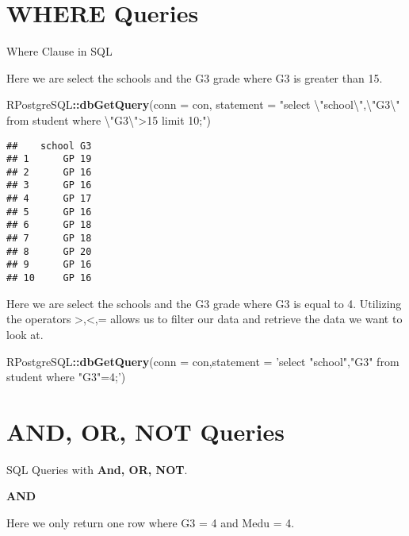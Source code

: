 \documentclass[]{book}
\newenvironment{Shaded}{\begin{snugshade}}{\end{snugshade}}
\newcommand{\KeywordTok}[1]{\textcolor[rgb]{0.13,0.29,0.53}{\textbf{#1}}}
\newcommand{\DataTypeTok}[1]{\textcolor[rgb]{0.13,0.29,0.53}{#1}}
\newcommand{\CharTok}[1]{\textcolor[rgb]{0.31,0.60,0.02}{#1}}
\newcommand{\StringTok}[1]{\textcolor[rgb]{0.31,0.60,0.02}{#1}}
\newcommand{\OperatorTok}[1]{\textcolor[rgb]{0.81,0.36,0.00}{\textbf{#1}}}
\newcommand{\NormalTok}[1]{#1}
\begin{document}
\section{WHERE Queries}\label{where-queries}

Where Clause in SQL

Here we are select the schools and the G3 grade where G3 is greater than
15.

\begin{Shaded}
\begin{Highlighting}[]
\NormalTok{RPostgreSQL}\OperatorTok{::}\KeywordTok{dbGetQuery}\NormalTok{(}\DataTypeTok{conn =}\NormalTok{ con, }\DataTypeTok{statement =} \StringTok{"select }\CharTok{\textbackslash{}"}\StringTok{school}\CharTok{\textbackslash{}"}\StringTok{,}\CharTok{\textbackslash{}"}\StringTok{G3}\CharTok{\textbackslash{}"}\StringTok{ from student where }\CharTok{\textbackslash{}"}\StringTok{G3}\CharTok{\textbackslash{}"}\StringTok{>15 limit 10;"}\NormalTok{)}
\end{Highlighting}
\end{Shaded}

\begin{verbatim}
##    school G3
## 1      GP 19
## 2      GP 16
## 3      GP 16
## 4      GP 17
## 5      GP 16
## 6      GP 18
## 7      GP 18
## 8      GP 20
## 9      GP 16
## 10     GP 16
\end{verbatim}

Here we are select the schools and the G3 grade where G3 is equal to 4.
Utilizing the operators \textgreater{},\textless{},= allows us to filter
our data and retrieve the data we want to look at.

\begin{Shaded}
\begin{Highlighting}[]
\NormalTok{RPostgreSQL}\OperatorTok{::}\KeywordTok{dbGetQuery}\NormalTok{(}\DataTypeTok{conn =}\NormalTok{ con,}\DataTypeTok{statement =} \StringTok{'select "school","G3" from student where "G3"=4;'}\NormalTok{)}
\end{Highlighting}
\end{Shaded}

\section{AND, OR, NOT Queries}\label{and-or-not-queries}

SQL Queries with \textbf{And, OR, NOT}.

\textbf{AND}

Here we only return one row where G3 = 4 and Medu = 4.
\end{document}
